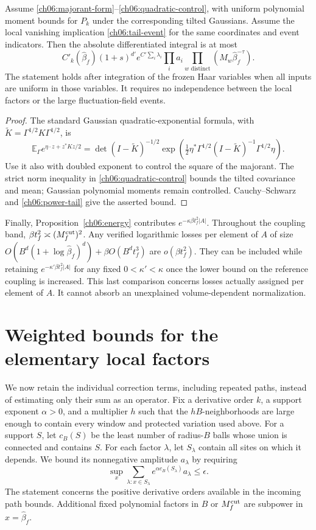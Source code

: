\begin{proposition}
\label{ch06:common-majorant}
Assume \eqref{ch06:majorant-form}--\eqref{ch06:quadratic-control}, with
uniform polynomial moment bounds for $P_k$ under the corresponding
tilted Gaussians. Assume the local vanishing implication
\eqref{ch06:tail-event} for the same coordinates and event indicators. Then the
absolute differentiated integral is at most
\[
 C'_k(\widehat\beta_f)(1+s)^{d'}
       e^{C'\sum_i\lambda_i}\prod_i a_i
                  \prod_{w\text{ distinct}}(M_w\widehat\beta_f^{-\tau}).
\]
The statement holds after integration of the frozen Haar variables when
all inputs are uniform in those variables. It requires no independence
between the local factors or the large fluctuation-field events.
\end{proposition}
\begin{proof}
The standard Gaussian quadratic-exponential formula, with
$\widetilde K=\Gamma^{1/2}K\Gamma^{1/2}$, is
\[
 \mathbb E_\Gamma e^{\eta\cdot z+z^*Kz/2}
 =\det(I-\widetilde K)^{-1/2}
   \exp\left(\tfrac12\eta^*\Gamma^{1/2}
           (I-\widetilde K)^{-1}\Gamma^{1/2}\eta\right).
\]
Use it also with doubled exponent to control the square of the majorant.
The strict norm inequality in \eqref{ch06:quadratic-control} bounds the tilted
covariance and mean; Gaussian polynomial moments remain controlled.
Cauchy--Schwarz and \eqref{ch06:power-tail} give the asserted bound.
\end{proof}

Finally, Proposition~\ref{ch06:energy} contributes
$e^{-\kappa\beta t_f^2|A|}$. Throughout the coupling band,
$\beta t_f^2\asymp(M_f^{\rm cut})^2$. Any verified
logarithmic losses per element of $A$ of size
$O(B^d(1+\log\widehat\beta_f)^d)+\beta O(B^dt_f^3)$ are
$o(\beta t_f^2)$. They can be included while retaining
$e^{-\kappa'\beta t_f^2|A|}$ for any fixed $0<\kappa'<\kappa$ once the
lower bound on the reference coupling is increased. This last comparison concerns losses
actually assigned per element of $A$. It cannot absorb an unexplained
volume-dependent normalization.

\section{Weighted bounds for the elementary local factors}
\label{ch06:primitive-bounds}

We now retain the individual correction terms, including repeated paths,
instead of estimating only their sum as an operator. Fix a derivative
order $k$, a support exponent $\alpha>0$, and a multiplier $h$ such that the $hB$-neighborhoods are
large enough to contain every window and protected variation used above.
For a support $S$, let $c_B(S)$ be the least number of radius-$B$
balls whose union is connected and contains $S$. For each factor
$\lambda$, let $S_\lambda$ contain all sites on which it depends.
We bound its nonnegative amplitude $a_\lambda$ by requiring
\[
 \sup_x\sum_{\lambda:x\in S_\lambda}
               e^{\alpha c_B(S_\lambda)}a_\lambda\le\epsilon.
\]
The statement concerns the positive derivative orders available in the
incoming path bounds. Additional fixed polynomial factors in $B$ or
$M_f^{\rm cut}$ are subpower in $x=\widehat\beta_f$.

